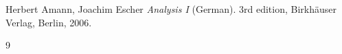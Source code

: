 \documentclass[a4paper,12pt]{scrartcl}
\begin{document}




\begin{thebibliography}{9}
Herbert Amann, Joachim Escher
\textit{Analysis I} (German). 
3rd edition, Birkh{\"a}user Verlag, Berlin, 2006.


\end{thebibliography}{9}
\end{document}
